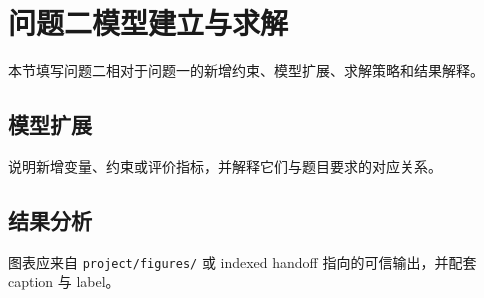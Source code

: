 \section{问题二模型建立与求解}
\label{sec:model-2}

本节填写问题二相对于问题一的新增约束、模型扩展、求解策略和结果解释。

\subsection{模型扩展}

说明新增变量、约束或评价指标，并解释它们与题目要求的对应关系。

\subsection{结果分析}

图表应来自 \texttt{project/figures/} 或 indexed handoff 指向的可信输出，并配套 caption 与 label。
